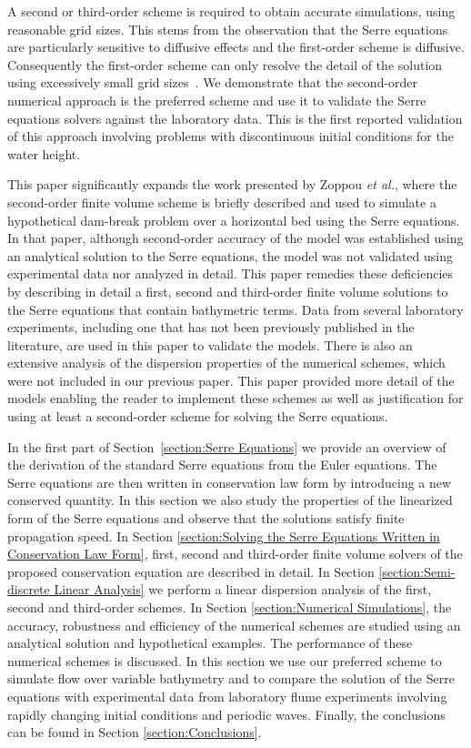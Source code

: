 \documentclass[preprint,sort&compress,1p]{article}
\begin{document}
A second or third-order scheme is required to obtain accurate simulations, using reasonable grid sizes. This stems from the observation that the Serre equations are particularly sensitive to diffusive effects  and the first-order scheme is diffusive. Consequently the first-order scheme can only resolve the detail of the solution using excessively small grid sizes~\cite{Zoppou-C-2014}. We demonstrate that the second-order numerical approach is the preferred scheme and use it to validate the Serre equations solvers against the laboratory data. This is the first reported validation of this approach involving problems with discontinuous initial conditions for the water height.

This paper significantly expands the work presented by Zoppou \emph{et al.}\cite{Zoppou-etal-2015-385}, where the second-order finite volume scheme is briefly described and used to simulate a hypothetical dam-break problem over a horizontal bed using the Serre equations. In that paper, although second-order accuracy of the model was established using an analytical solution to the Serre equations, the model was not validated using experimental data nor analyzed in detail. This paper remedies these deficiencies by describing in detail a first, second and third-order finite volume solutions to the Serre equations that contain bathymetric terms. Data from several laboratory experiments, including one that has not been previously published in the literature, are used in this paper to validate the models. There is also an extensive analysis of the dispersion properties of the numerical schemes, which were not included in our previous paper. This paper provided more detail of the models enabling the reader to implement these schemes as well as justification for using at least a second-order scheme for solving the Serre equations.

In the first part of Section~\ref{section:Serre Equations} we provide an  overview of the derivation of the standard Serre equations from the Euler equations. The Serre equations are then written in conservation law form by introducing a new conserved quantity. In this section we also study the properties of the linearized form of the Serre equations and observe that the solutions satisfy finite propagation speed. In  Section \ref{section:Solving the Serre Equations Written in Conservation Law Form},  first, second and third-order finite volume solvers of the proposed conservation equation are described in detail.  In Section \ref{section:Semi-discrete Linear Analysis} we perform a linear dispersion analysis of the first, second and third-order schemes. In Section \ref{section:Numerical Simulations}, the accuracy, robustness and efficiency  of the numerical schemes are studied using an analytical solution and  hypothetical examples. The performance of these numerical schemes is discussed. In this section we use our preferred scheme to simulate flow over variable bathymetry and to compare the solution of the Serre equations with experimental data from laboratory flume experiments involving rapidly changing initial conditions and periodic waves.
Finally, the conclusions can be found in Section \ref{section:Conclusions}.
\end{document}
